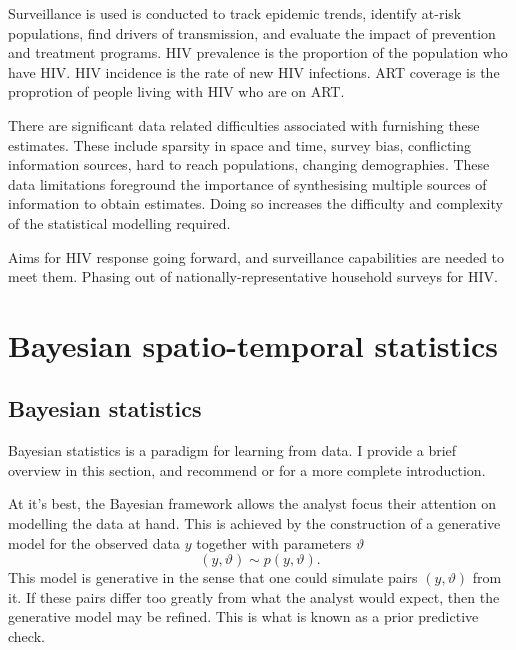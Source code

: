 \documentclass[a4paper, nobind]{templates/ociamthesis}
\begin{document}
Surveillance is used is conducted to track epidemic trends, identify at-risk populations, find drivers of transmission, and evaluate the impact of prevention and treatment programs.
HIV prevalence is the proportion of the population who have HIV.
HIV incidence is the rate of new HIV infections.
ART coverage is the proprotion of people living with HIV who are on ART.

There are significant data related difficulties associated with furnishing these estimates.
These include sparsity in space and time, survey bias, conflicting information sources, hard to reach populations, changing demographies.
These data limitations foreground the importance of synthesising multiple sources of information to obtain estimates.
Doing so increases the difficulty and complexity of the statistical modelling required.

Aims for HIV response going forward, and surveillance capabilities are needed to meet them.
Phasing out of nationally-representative household surveys for HIV.

\hypertarget{bayesian-spatio-temporal-statistics}{%
\section{Bayesian spatio-temporal statistics}\label{bayesian-spatio-temporal-statistics}}

\hypertarget{bayesian-statistics}{%
\subsection{Bayesian statistics}\label{bayesian-statistics}}

Bayesian statistics is a paradigm for learning from data.
I provide a brief overview in this section, and recommend \textcite{mcelreath2020statistical} or \textcite{gelman2013bayesian} for a more complete introduction.

At it's best, the Bayesian framework allows the analyst focus their attention on modelling the data at hand.
This is achieved by the construction of a generative model for the observed data \(y\) together with parameters \(\vartheta\)
\begin{equation}
(y, \vartheta) \sim p(y, \vartheta).
\end{equation}
This model is generative in the sense that one could simulate pairs \((y, \vartheta)\) from it.
If these pairs differ too greatly from what the analyst would expect, then the generative model may be refined.
This is what is known as a prior predictive check.
\end{document}

